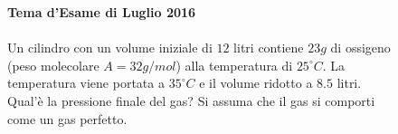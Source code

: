 \begin{figure}[h!]
	\textbf{Tema d'Esame di Luglio 2016}\\ \\
	Un cilindro con un volume iniziale di $12$ litri contiene $23 g$ di ossigeno (peso
molecolare $A = 32 g/mol$) alla temperatura di $25^{\circ}C$. La temperatura viene portata a $35^{\circ}C$ e il
volume ridotto a $8.5$ litri. Qual'è la pressione finale del gas? Si assuma che il gas si comporti
come un gas perfetto.
\end{figure}